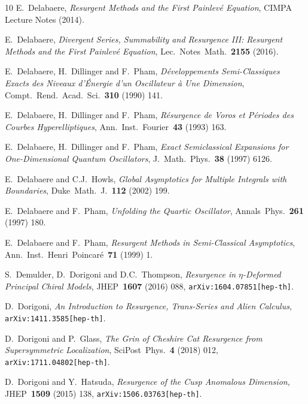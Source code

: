 \documentclass[11pt,a4paper]{article}
\begin{document}
\begin{thebibliography}{10}
E.~Delabaere,
\textit{Resurgent Methods and the First Painlev\'e Equation},
CIMPA Lecture Notes (2014).

E.~Delabaere,
\textit{Divergent Series, Summability and Resurgence III: Resurgent Methods and the First Painlev\'e Equation},
Lec.\ Notes\ Math.\ \textbf{2155} (2016).

E.~Delabaere, H.~Dillinger and F.~Pham,
\textit{D\'eveloppements Semi-Classiques Exacts des Niveaux d'\'Energie d'un Oscillateur \`a Une Dimension},
Compt.\ Rend.\ Acad.\ Sci.\ \textbf{310} (1990) 141.

E.~Delabaere, H.~Dillinger and F.~Pham,
\textit{R\'esurgence de Voros et P\'eriodes des Courbes Hyperelliptiques},
Ann.\ Inst.\ Fourier\ \textbf{43} (1993) 163.

E.~Delabaere, H.~Dillinger and F.~Pham,
\textit{Exact Semiclassical Expansions for One-Dimensional Quantum Oscillators},
J.\ Math.\ Phys.\ \textbf{38} (1997) 6126.

E.~Delabaere and C.J.~Howls,
\textit{Global Asymptotics for Multiple Integrals with Boundaries},
Duke\ Math.\ J.\ \textbf{112} (2002) 199.

E.~Delabaere and F.~Pham,
\textit{Unfolding the Quartic Oscillator},
Annals\ Phys.\ \textbf{261} (1997) 180.

E.~Delabaere and F.~Pham,
\textit{Resurgent Methods in Semi-Classical Asymptotics},
Ann.\ Inst.\ Henri\ Poincar\'e\ \textbf{71} (1999) 1.

S.~Demulder, D.~Dorigoni and D.C.~Thompson,
\textit{Resurgence in $\eta$-Deformed Principal Chiral Models},
JHEP\ \textbf{1607} (2016) 088,
\texttt{arXiv:1604.07851[hep-th]}.

D.~Dorigoni,
\textit{An Introduction to Resurgence, Trans-Series and Alien Calculus},
\texttt{arXiv:1411.3585[hep-th]}.

D.~Dorigoni and P.~Glass,
\textit{The Grin of Cheshire Cat Resurgence from Supersymmetric Localization},
SciPost\ Phys.\ \textbf{4} (2018) 012,
\texttt{arXiv:1711.04802[hep-th]}.

D.~Dorigoni and Y.~Hatsuda,
\textit{Resurgence of the Cusp Anomalous Dimension},
JHEP\ \textbf{1509} (2015) 138,
\texttt{arXiv:1506.03763[hep-th]}.


\end{thebibliography}
\end{document}
